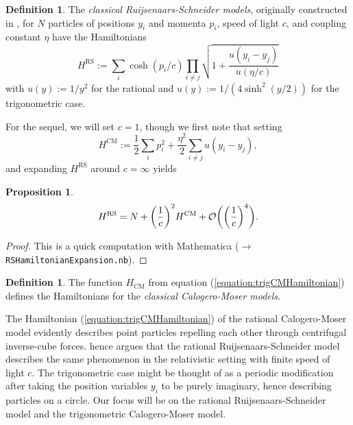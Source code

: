 \documentclass[11pt]{report}
\newtheorem{prop}[theorem]{Proposition}
\theoremstyle{definition}
\newtheorem{definition}[theorem]{Definition}
\theoremstyle{remark}
\theoremstyle{remark}
\begin{document}
\begin{definition}
The \emph{classical Ruijsenaars-Schneider models}, originally constructed in \cite{article:ruijsenaars:1987}, for $N$ particles of positions $y_i$ and momenta $p_i$, speed of light $c$, and coupling constant $\eta$ have the Hamiltonians
\begin{equation}\label{equation:ratRSHamiltonian}
H^\text{RS} := \sum_i \cosh(p_i/c) \prod_{i \neq j} \sqrt{1 + \frac{u(y_i - y_j)}{u(\eta/c)}}
\end{equation}
with $u(y) := 1/y^2$ for the rational and $u(y) := 1/(4\sinh^2(y/2))$ for the trigonometric case.
\end{definition}

For the sequel, we will set $c=1$, though we first note that setting
\begin{equation}\label{equation:trigCMHamiltonian}
H^\text{CM} := \frac{1}{2} \sum_i p_i^2 + \frac{\eta^2}{2} \sum_{i \neq j} u(y_i-y_j),
\end{equation}
and expanding $H^\text{RS}$ around $c = \infty$ yields

\begin{prop}
\begin{equation*}
H^\textnormal{RS} = N + \bigg( \frac{1}{c} \bigg)^2 H^\textnormal{CM} + \mathcal{O}\bigg( \bigg( \frac{1}{c} \bigg)^4 \bigg).
\end{equation*}
\end{prop}

\begin{proof}
This is a quick computation with Mathematica ($\to$ \texttt{RSHamiltonianExpansion.nb}).
\end{proof}

\begin{definition}
The function $H_\text{CM}$ from equation (\ref{equation:trigCMHamiltonian}) defines the Hamiltonians for the \emph{classical Calogero-Moser models}.
\end{definition}

The Hamiltonian (\ref{equation:trigCMHamiltonian}) of the rational Calogero-Moser model evidently describes point particles repelling each other through centrifugal inverse-cube forces. \cite{article:ruijsenaars:1987} hence argues that the rational Ruijsenaars-Schneider model describes the same phenomenon in the relativistic setting with finite speed of light $c$. The trigonometric case might be thought of as a periodic modification after taking the position variables $y_i$ to be purely imaginary, hence describing particles on a circle. Our focus will be on the rational Ruijsenaars-Schneider model and the trigonometric Calogero-Moser model.
\end{document}
